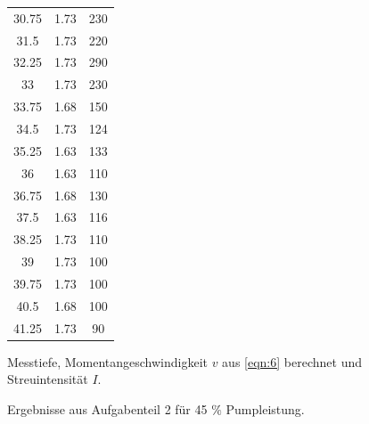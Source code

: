 \begin{figure}
\begin{subtable}{0.4\textwidth}
\begin{tabular}{c c c}
            30.75 &  1.73 & 230 \\
            31.5 & 1.73 & 220 \\
            32.25 & 1.73 & 290 \\
            33 & 1.73 & 230 \\
            33.75 &  1.68 & 150 \\
            34.5 & 1.73 & 124 \\
            35.25 & 1.63 & 133 \\
            36 & 1.63 & 110 \\
            36.75 & 1.68 & 130 \\
            37.5 & 1.63 & 116 \\
            38.25 & 1.73 & 110 \\
            39 & 1.73 & 100 \\
            39.75 & 1.73 & 100 \\
            40.5 & 1.68 & 100 \\
            41.25 & 1.73 & 90 \\
            \bottomrule
        \end{tabular}
        \caption{Messtiefe, Momentangeschwindigkeit $v$ aus \eqref{eqn:6} berechnet und Streuintensität $I$.}
        \label{tab:5}
        \qquad
      \end{subtable}
      \caption{Ergebnisse aus Aufgabenteil 2 für 45 $\%$ Pumpleistung.}
    \end{figure}

